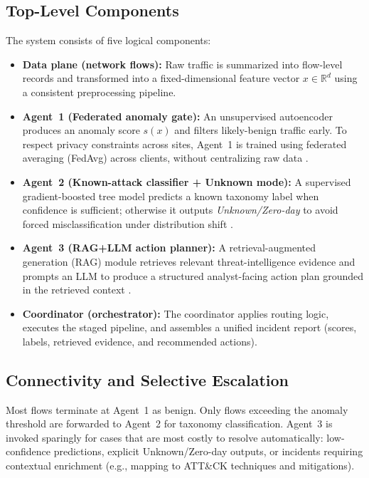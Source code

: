 \documentclass[conference]{IEEEtran}
\begin{document}
\subsection{Top-Level Components}
The system consists of five logical components:
\begin{itemize}
  \item \textbf{Data plane (network flows):} Raw traffic is summarized into flow-level records and transformed into a fixed-dimensional feature vector $x\in\mathbb{R}^d$ using a consistent preprocessing pipeline.
  \item \textbf{Agent~1 (Federated anomaly gate):} An unsupervised autoencoder produces an anomaly score $s(x)$ and filters likely-benign traffic early. To respect privacy constraints across sites, Agent~1 is trained using federated averaging (FedAvg) across clients, without centralizing raw data \cite{mcmahan2017fedavg,kairouz2021flsurvey}.
  \item \textbf{Agent~2 (Known-attack classifier + Unknown mode):} A supervised gradient-boosted tree model predicts a known taxonomy label when confidence is sufficient; otherwise it outputs \emph{Unknown/Zero-day} to avoid forced misclassification under distribution shift \cite{Chen2016XGBoost,Scheirer2013OpenSet,Bendale2016OpenMax}.
  \item \textbf{Agent~3 (RAG+LLM action planner):} A retrieval-augmented generation (RAG) module retrieves relevant threat-intelligence evidence and prompts an LLM to produce a structured analyst-facing action plan grounded in the retrieved context \cite{Lewis2020RAG,nist80061,MITREATTACK,MITRECVE,NISTNVD}.
  \item \textbf{Coordinator (orchestrator):} The coordinator applies routing logic, executes the staged pipeline, and assembles a unified incident report (scores, labels, retrieved evidence, and recommended actions).
\end{itemize}

\subsection{Connectivity and Selective Escalation}
Most flows terminate at Agent~1 as benign. Only flows exceeding the anomaly threshold are forwarded to Agent~2 for taxonomy classification. Agent~3 is invoked sparingly for cases that are most costly to resolve automatically: low-confidence predictions, explicit Unknown/Zero-day outputs, or incidents requiring contextual enrichment (e.g., mapping to ATT\&CK techniques and mitigations).
\end{document}
